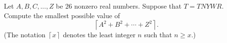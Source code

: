 Let $A,B,C,...,Z$ be $26$ nonzero real numbers. Suppose that $T=TNYWR$. Compute the smallest possible value of \[
	  \left\lceil A^2+B^2+\cdots+Z^2\right\rceil .
\] (The notation $\left\lceil x\right\rceil$ denotes the least integer $n$ such that $n\geq x$.)
